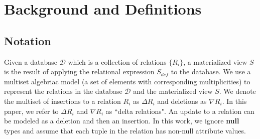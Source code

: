 \section{Background and Definitions}\label{sec-background}
\vspace{-.5em}
\subsection{Notation}
Given a database $\mathcal{D}$ which is a collection of relations $\{R_i\}$, a materialized view $S$ is the result of applying the relational expression $S_{def}$ to the database.
We use a multiset algebriac model (a set of elements with corresponding multiplicities) to represent the relations in the database $\mathcal{D}$ and the materialized view $S$.
We denote the multiset of insertions to a relation $R_i$ as $\Delta R_i$ and deletions as $\nabla R_i$.
In this paper, we refer to $\Delta R_i$ and $\nabla R_i$ as ``delta relations".
An update to a relation can be modeled as a deletion and then an insertion.
In this work, we ignore \textbf{null} types and assume that each tuple in the relation has non-null attribute values.

